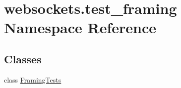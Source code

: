 \hypertarget{namespacewebsockets_1_1test__framing}{}\section{websockets.\+test\+\_\+framing Namespace Reference}
\label{namespacewebsockets_1_1test__framing}
\subsection*{Classes}
\begin{DoxyCompactItemize}
\item 
class \hyperlink{classwebsockets_1_1test__framing_1_1_framing_tests}{Framing\+Tests}
\end{DoxyCompactItemize}

